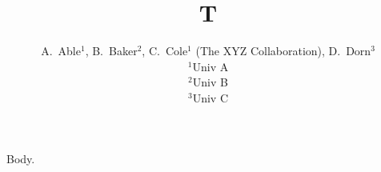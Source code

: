\documentclass{article}
\begin{document}
\title{T}
\author{A.~Able$^{1}$, B.~Baker$^{2}$, C.~Cole$^{1}$ (The XYZ Collaboration), D.~Dorn$^{3}$\\
$^{1}$Univ A\\ $^{2}$Univ B\\ $^{3}$Univ C}
\maketitle
Body.
\end{document}
